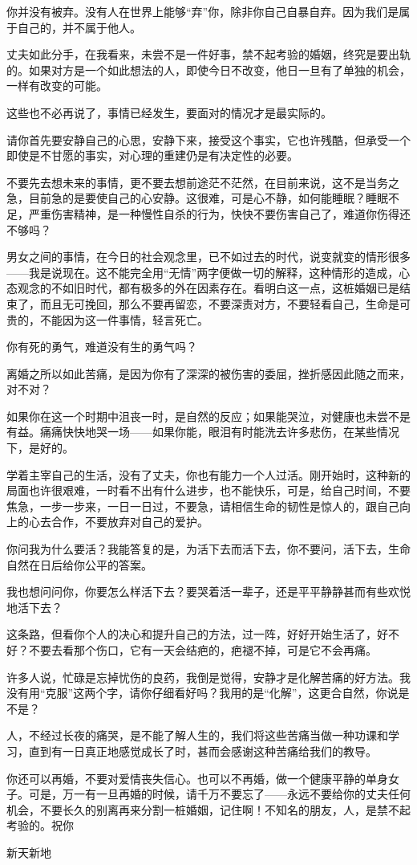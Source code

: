 \par {}
\par 你并没有被弃。没有人在世界上能够“弃”你，除非你自己自暴自弃。因为我们是属于自己的，并不属于他人。
\par 丈夫如此分手，在我看来，未尝不是一件好事，禁不起考验的婚姻，终究是要出轨的。如果对方是一个如此想法的人，即使今日不改变，他日一旦有了单独的机会，一样有改变的可能。
\par 这些也不必再说了，事情已经发生，要面对的情况才是最实际的。
\par 请你首先要安静自己的心思，安静下来，接受这个事实，它也许残酷，但承受一个即使是不甘愿的事实，对心理的重建仍是有决定性的必要。
\par 不要先去想未来的事情，更不要去想前途茫不茫然，在目前来说，这不是当务之急，目前急的是要使自己的心安静。这很难，可是心不静，如何能睡眠？睡眠不足，严重伤害精神，是一种慢性自杀的行为，快快不要伤害自己了，难道你伤得还不够吗？
\par 男女之间的事情，在今日的社会观念里，已不如过去的时代，说变就变的情形很多——我是说现在。这不能完全用“无情”两字便做一切的解释，这种情形的造成，心态观念的不如旧时代，都有极多的外在因素存在。看明白这一点，这桩婚姻已是结束了，而且无可挽回，那么不要再留恋，不要深责对方，不要轻看自己，生命是可贵的，不能因为这一件事情，轻言死亡。
\par 你有死的勇气，难道没有生的勇气吗？
\par 离婚之所以如此苦痛，是因为你有了深深的被伤害的委屈，挫折感因此随之而来，对不对？
\par 如果你在这一个时期中沮丧一时，是自然的反应；如果能哭泣，对健康也未尝不是有益。痛痛快快地哭一场——如果你能，眼泪有时能洗去许多悲伤，在某些情况下，是好的。
\par 学着主宰自己的生活，没有了丈夫，你也有能力一个人过活。刚开始时，这种新的局面也许很艰难，一时看不出有什么进步，也不能快乐，可是，给自己时间，不要焦急，一步一步来，一日一日过，不要急，请相信生命的韧性是惊人的，跟自己向上的心去合作，不要放弃对自己的爱护。
\par 你问我为什么要活？我能答复的是，为活下去而活下去，你不要问，活下去，生命自然在日后给你公平的答案。
\par 我也想问问你，你要怎么样活下去？要哭着活一辈子，还是平平静静甚而有些欢悦地活下去？
\par 这条路，但看你个人的决心和提升自己的方法，过一阵，好好开始生活了，好不好？不要去看那个伤口，它有一天会结疤的，疤褪不掉，可是它不会再痛。
\par 许多人说，忙碌是忘掉忧伤的良药，我倒是觉得，安静才是化解苦痛的好方法。我没有用“克服”这两个字，请你仔细看好吗？我用的是“化解”，这更合自然，你说是不是？
\par 人，不经过长夜的痛哭，是不能了解人生的，我们将这些苦痛当做一种功课和学习，直到有一日真正地感觉成长了时，甚而会感谢这种苦痛给我们的教导。
\par 你还可以再婚，不要对爱情丧失信心。也可以不再婚，做一个健康平静的单身女子。可是，万一有一旦再婚的时候，请千万不要忘了——永远不要给你的丈夫任何机会，不要长久的别离再来分割一桩婚姻，记住啊！不知名的朋友，人，是禁不起考验的。祝你
\par 新天新地
\par {}



